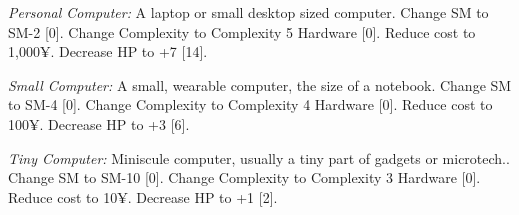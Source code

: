 \begin{multicols*}{3}
	\textit{Personal Computer:} A laptop or small desktop sized computer. Change SM to SM-2 [0]. Change Complexity to Complexity 5 Hardware [0]. Reduce cost to 1,000¥. Decrease HP to +7 [14].
	
	\textit{Small Computer:} A small, wearable computer, the size of a notebook. Change SM to SM-4 [0]. Change Complexity to Complexity 4 Hardware [0]. Reduce cost to 100¥. Decrease HP to +3 [6].
	
	\textit{Tiny Computer:} Miniscule computer, usually a tiny part of gadgets or microtech.. Change SM to SM-10 [0]. Change Complexity to Complexity 3 Hardware [0]. Reduce cost to 10¥. Decrease HP to +1 [2].
	
	
	
\end{multicols*}